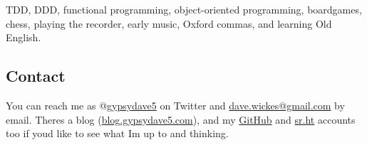 TDD, DDD, functional programming, object-oriented programming,
boardgames, chess, playing the recorder, early music, Oxford commas, and
learning Old English.

\subsection{Contact}\label{contact}

You can reach me as @\href{https://twitter.com/gypsydave5}{gypsydave5}
on Twitter and \href{mailto:dave@gypsydave5.com}{dave.wickes@gmail.com}
by email. There\textquotesingle s a blog
(\href{http://blog.gypsydave5.com/}{blog.gypsydave5.com}), and my
\href{https://github.com/gypsydave5}{GitHub} and
\href{https://git.sr.ht/~dew/}{sr.ht} accounts too if
you\textquotesingle d like to see what I\textquotesingle m up to and
thinking.
